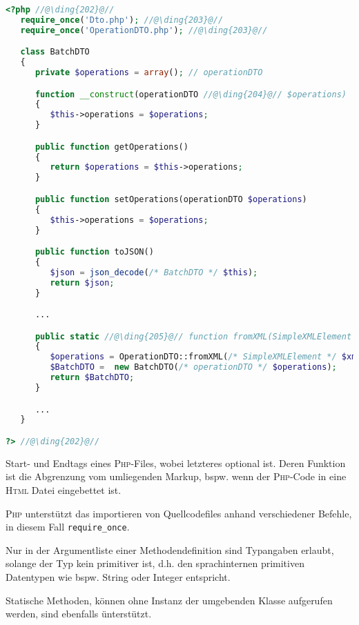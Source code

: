 \begin{lstlisting}[language=php, caption=Durch den Generator erzeugte Batch\textsc{DTO} Datenklasse der Spreadshirt-\textsc{API} als Beispiel für eine \textsc{PHP}-Datei]
<?php //@\ding{202}@//
   require_once('Dto.php'); //@\ding{203}@//
   require_once('OperationDTO.php'); //@\ding{203}@//

   class BatchDTO
   {
      private $operations = array(); // operationDTO 

      function __construct(operationDTO //@\ding{204}@// $operations) 
      {
         $this->operations = $operations;
      }

      public function getOperations()
      {
         return $operations = $this->operations;
      }

      public function setOperations(operationDTO $operations)
      {
         $this->operations = $operations;
      }

      public function toJSON()
      {
         $json = json_decode(/* BatchDTO */ $this);
         return $json;
      }

      ...

      public static //@\ding{205}@// function fromXML(SimpleXMLElement $xml)
      {
         $operations = OperationDTO::fromXML(/* SimpleXMLElement */ $xml->operations);
         $BatchDTO =  new BatchDTO(/* operationDTO */ $operations);
         return $BatchDTO;
      }

      ...
   }

?> //@\ding{202}@//
\end{lstlisting}

\begin{compactitem}
    \item[\ding{202}] Start- und Endtags eines \textsc{Php}-Files, wobei letzteres optional ist. Deren Funktion ist die Abgrenzung vom umliegenden Markup, bspw. wenn der \textsc{Php}-Code in eine \textsc{Html} Datei eingebettet ist.
    \item[\ding{203}] \textsc{Php} unterstützt das importieren von Quellcodefiles anhand verschiedener Befehle, in diesem Fall \texttt{require\_once}.
    \item[\ding{204}] Nur in der Argumentliste einer Methodendefinition sind Typangaben erlaubt, solange der Typ kein primitiver ist, d.h. den sprachinternen primitiven Datentypen wie bspw. String oder Integer entspricht. 
    \item[\ding{205}] Statische Methoden, können ohne Instanz der umgebenden Klasse aufgerufen werden, sind ebenfalls ünterstützt.
\end{compactitem}
